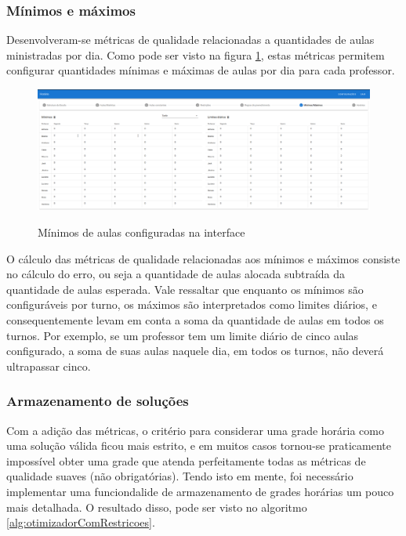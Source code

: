 \subsubsection{Mínimos e máximos}

Desenvolveram-se métricas de qualidade relacionadas a quantidades de aulas ministradas por dia. Como pode ser visto na figura \ref{fig:tela_minimos}, estas métricas permitem configurar quantidades mínimas e máximas de aulas por dia para cada professor.

\begin{figure}[htb!]
	\centering
	\caption{Mínimos de aulas configuradas na interface}
	\includegraphics[width=1\textwidth]{./dados/figuras/minimos_configurados}
	\label{fig:tela_minimos}
\end{figure}

O cálculo das métricas de qualidade relacionadas aos mínimos e máximos consiste no cálculo do erro, ou seja a quantidade de aulas alocada subtraída da quantidade de aulas esperada. Vale ressaltar que enquanto os mínimos são configuráveis por turno, os máximos são interpretados como limites diários, e consequentemente levam em conta a soma da quantidade de aulas em todos os turnos. Por exemplo, se um professor tem um limite diário de cinco aulas configurado, a soma de suas aulas naquele dia, em todos os turnos, não deverá ultrapassar cinco.

\subsubsection{Armazenamento de soluções}
\label{subsec:salvamento}

Com a adição das métricas, o critério para considerar uma grade horária como uma solução válida ficou mais estrito, e em muitos casos tornou-se praticamente impossível obter uma grade que atenda perfeitamente todas as métricas de qualidade suaves (não obrigatórias). Tendo isto em mente, foi necessário implementar uma funciondalide de armazenamento de grades horárias um pouco mais detalhada. O resultado disso, pode ser visto no algoritmo \ref{alg:otimizadorComRestricoes}.

